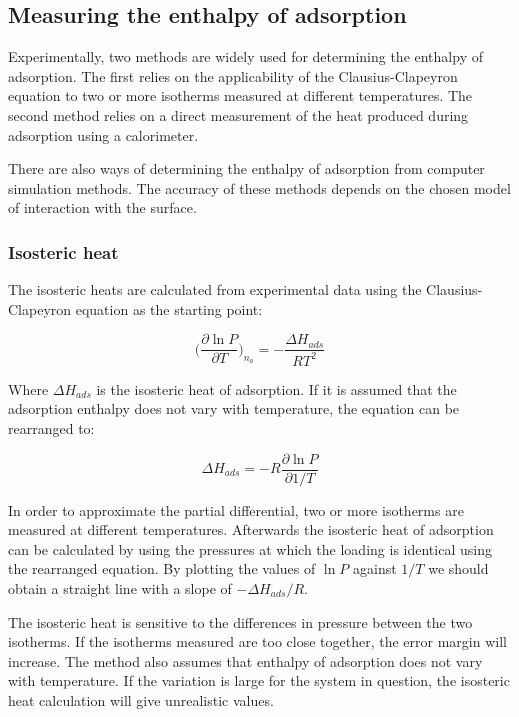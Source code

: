 \subsection{Measuring the enthalpy of adsorption}

Experimentally, two methods are widely used for determining the 
enthalpy of adsorption. The first relies on the applicability of the 
Clausius-Clapeyron equation to two or more isotherms measured 
at different temperatures. The second method relies on a 
direct measurement of the heat produced during adsorption 
using a calorimeter.

There are also ways of determining the enthalpy of adsorption
from computer simulation methods. The accuracy of these methods
depends on the chosen model of interaction with the surface.

\subsubsection{Isosteric heat}

The isosteric heats are calculated from experimental data using the
Clausius-Clapeyron equation as the starting point:

\begin{equation}
    \Big( \frac{\partial \ln P}{\partial T} \Big)_{n_a} = -\frac{\Delta H_{ads}}{R T^2}
\end{equation}

Where \(\Delta H_{ads}\) is the isosteric heat of adsorption.
If it is assumed that the adsorption enthalpy does not vary with 
temperature, the equation can be rearranged to:

\begin{equation}
    \Delta H_{ads} = - R \frac{\partial \ln P}{\partial 1 / T}
\end{equation}

In order to approximate the partial differential, two or more
isotherms are measured at different temperatures. 
Afterwards the isosteric heat of adsorption can be calculated
by using the pressures at which the loading is identical using the 
rearranged equation. By plotting the values of \(\ln P\) against
\(1 / T\) we should obtain a straight line with a slope
of \(- \Delta H_{ads} / R\).

The isosteric heat is sensitive to the differences in pressure between
the two isotherms. If the isotherms measured are too close together, 
the error margin will increase. The method also assumes that enthalpy 
of adsorption does not vary with temperature. If the
variation is large for the system in question, the isosteric
heat calculation will give unrealistic values.

